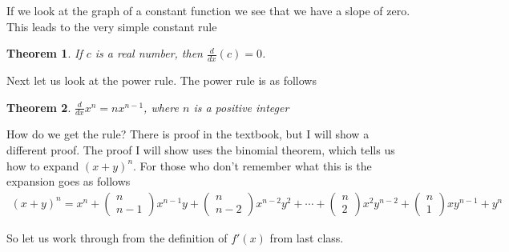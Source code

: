 \documentclass[12pt,reqno]{article}
\newtheorem{Theorem}{Theorem}
\theoremstyle{definition}
\begin{document}
If we look at the graph of a constant function we see that we have a slope of zero. This leads to the very simple constant rule
\begin{Theorem}
	If $c$ is a real number, then $\frac{d}{dx} (c) = 0$. 
\end{Theorem}

Next let us look at the power rule. The power rule is as follows 
\begin{Theorem}
	$\frac{d}{dx} x^n = n x^{n  - 1}$, where $n$ is a positive integer
\end{Theorem}

How do we get the rule? There is proof in the textbook, but I will show a different proof. The proof I will show uses the binomial theorem, which tells us how to expand $(x + y)^n$. For those who don't remember what this is the expansion goes as follows 
\begin{align*}
	(x + y)^n = x^n + \begin{pmatrix}
		n \\ n - 1
	\end{pmatrix} x^{n - 1} y + \begin{pmatrix}
	n \\ n - 2
\end{pmatrix} x^{n - 2} y^2 + \cdots + \begin{pmatrix}
n \\ 2 
\end{pmatrix} x^2 y^{n - 2} + \begin{pmatrix}
n \\ 1
\end{pmatrix} xy^{n - 1} + y^{n}
\end{align*}

So let us work through from the definition of $f'(x)$ from last class. 
\end{document}
